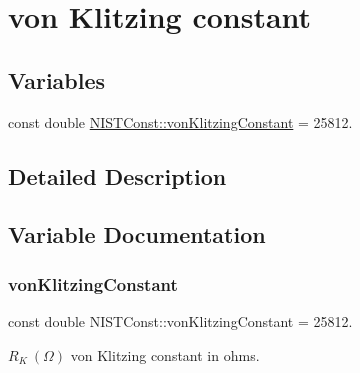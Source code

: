 \hypertarget{group___n_i_s_t_const-von_klitzing_constant}{}\section{von Klitzing constant}
\label{group___n_i_s_t_const-von_klitzing_constant}
\subsection*{Variables}
\begin{DoxyCompactItemize}
\item 
const double \mbox{\hyperlink{group___n_i_s_t_const-von_klitzing_constant_ga664441cab64a6a8feda702f6354c1e7f}{N\+I\+S\+T\+Const\+::von\+Klitzing\+Constant}} = 25812.
\end{DoxyCompactItemize}


\subsection{Detailed Description}


\subsection{Variable Documentation}
\mbox{\label{group___n_i_s_t_const-von_klitzing_constant_ga664441cab64a6a8feda702f6354c1e7f}} 
\subsubsection{\texorpdfstring{von\+Klitzing\+Constant}{vonKlitzingConstant}}
{\footnotesize\ttfamily const double N\+I\+S\+T\+Const\+::von\+Klitzing\+Constant = 25812.}

$R_K \ (\Omega)$ von Klitzing constant in ohms. 